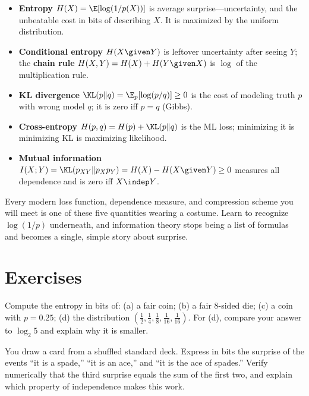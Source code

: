 \begin{itemize}
  \item \textbf{Entropy} $H(X) = \E[\log(1/p(X))]$ is average surprise---uncertainty, and the
        unbeatable cost in bits of describing $X$. It is maximized by the uniform distribution.
  \item \textbf{Conditional entropy} $H(X\given Y)$ is leftover uncertainty after seeing $Y$; the
        \textbf{chain rule} $H(X,Y) = H(X) + H(Y\given X)$ is $\log$ of the multiplication rule.
  \item \textbf{KL divergence} $\KL(p\|q) = \E_p[\log(p/q)] \ge 0$ is the cost of modeling truth $p$ with
        wrong model $q$; it is zero iff $p=q$ (Gibbs).
  \item \textbf{Cross-entropy} $H(p,q) = H(p) + \KL(p\|q)$ is the ML loss; minimizing it is minimizing KL
        is maximizing likelihood.
  \item \textbf{Mutual information} $I(X;Y) = \KL(p_{XY}\|p_Xp_Y) = H(X) - H(X\given Y) \ge 0$ measures
        all dependence and is zero iff $X\indep Y$.
\end{itemize}

Every modern loss function, dependence measure, and compression scheme you will meet is one of these five
quantities wearing a costume. Learn to recognize $\log(1/p)$ underneath, and information theory stops being
a list of formulas and becomes a single, simple story about surprise.

\section{Exercises}
\label{ch33:exercises}

\begin{exercise}
\label{ch33:ex-warmup}
Compute the entropy in bits of: (a) a fair coin; (b) a fair $8$-sided die; (c) a coin with $p=0.25$;
(d) the distribution $(\tfrac12, \tfrac14, \tfrac18, \tfrac1{16}, \tfrac1{16})$. For (d), compare your
answer to $\log_2 5$ and explain why it is smaller.
\end{exercise}

\begin{exercise}
\label{ch33:ex-surprise-adds}
You draw a card from a shuffled standard deck. Express in bits the surprise of the events ``it is a
spade,'' ``it is an ace,'' and ``it is the ace of spades.'' Verify numerically that the third surprise
equals the sum of the first two, and explain which property of independence makes this work.
\end{exercise}

